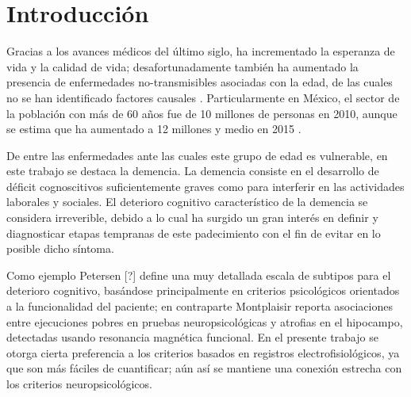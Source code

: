 
\chapter{Introducción}

Gracias a los avances médicos del último siglo, ha incrementado la esperanza de vida y la calidad
de vida; desafortunadamente también ha aumentado la presencia de enfermedades no-transmisibles 
asociadas con la edad, de las cuales no se han identificado factores causales 
\cite{PlanAlzheimer04}.
%
Particularmente en México, el sector de la población con más de 60 años fue de 10 millones de
personas en 2010, aunque se estima que ha aumentado a 12 millones y medio en 2015 
\cite{Censo10,Intercensal15}.


De entre las enfermedades ante las cuales este grupo de edad es vulnerable, en este trabajo se 
destaca la demencia. 
La demencia consiste en el desarrollo de déficit cognoscitivos suficientemente graves como para 
interferir en las actividades laborales y sociales.
%
El deterioro cognitivo característico de la demencia se considera irreverible, debido a lo cual 
ha surgido un gran interés en definir y diagnosticar etapas tempranas de este padecimiento con el 
fin de evitar en lo posible dicho síntoma.

%
Como ejemplo Petersen [?]
define una muy detallada escala de subtipos para el deterioro cognitivo, basándose principalmente
en criterios psicológicos orientados a la funcionalidad del paciente;
%
en contraparte Montplaisir \cite{Brayet16} reporta asociaciones entre ejecuciones pobres en pruebas
neuropsicológicas y atrofias en el hipocampo, detectadas usando resonancia magnética funcional.
En el presente trabajo se otorga cierta preferencia a los criterios basados en registros 
electrofisiológicos, ya que son más fáciles de cuantificar; aún así se mantiene una conexión 
estrecha con los criterios neuropsicológicos.

